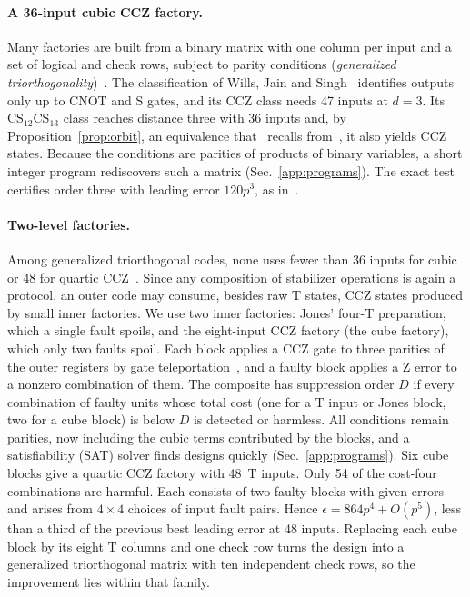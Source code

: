 \documentclass[aps,prl,reprint,twocolumn,amsmath,amssymb,floatfix,nofootinbib,superscriptaddress]{revtex4-2}
\newcommand{\CS}{\mathrm{CS}}
\newcommand{\QuarticUB}{48}
\newcommand{\QuarticCoef}{864}
\begin{document}
\paragraph*{A 36-input cubic CCZ factory.}
Many factories are built from a binary matrix with one column per input and a set of logical and check rows, subject to parity conditions (\emph{generalized triorthogonality})~\cite{bravyihaah,haah,wjs}. The classification of Wills, Jain and Singh~\cite{wjs} identifies outputs only up to CNOT and S gates, and its CCZ class needs 47 inputs at $d=3$. Its $\CS_{12}\CS_{13}$ class reaches distance three with 36 inputs and, by Proposition~\ref{prop:orbit}, an equivalence that~\cite{wjs} recalls from~\cite{howardcampbell}, it also yields CCZ states. Because the conditions are parities of products of binary variables, a short integer program rediscovers such a matrix (Sec.~\ref{app:programs}). The exact test certifies order three with leading error $120p^3$, as in~\cite{wjs}.

\paragraph*{Two-level factories.}
Among generalized triorthogonal codes, none uses fewer than 36 inputs for cubic or 48 for quartic CCZ~\cite{wjs}. Since any composition of stabilizer operations is again a protocol, an outer code may consume, besides raw T states, CCZ states produced by small inner factories. We use two inner factories: Jones' four-T preparation, which a single fault spoils, and the eight-input CCZ factory (the cube factory), which only two faults spoil. Each block applies a CCZ gate to three parities of the outer registers by gate teleportation~\cite{gottesmanchuang}, and a faulty block applies a Z error to a nonzero combination of them. The composite has suppression order $D$ if every combination of faulty units whose total cost (one for a T input or Jones block, two for a cube block) is below $D$ is detected or harmless. All conditions remain parities, now including the cubic terms contributed by the blocks, and a satisfiability (SAT) solver finds designs quickly (Sec.~\ref{app:programs}). Six cube blocks give a quartic CCZ factory with \QuarticUB\ T inputs. Only 54 of the cost-four combinations are harmful. Each consists of two faulty blocks with given errors and arises from $4\times4$ choices of input fault pairs. Hence $\epsilon=\QuarticCoef p^4+O(p^5)$, less than a third of the previous best leading error at 48 inputs. Replacing each cube block by its eight T columns and one check row turns the design into a generalized triorthogonal matrix with ten independent check rows, so the improvement lies within that family.
\end{document}
